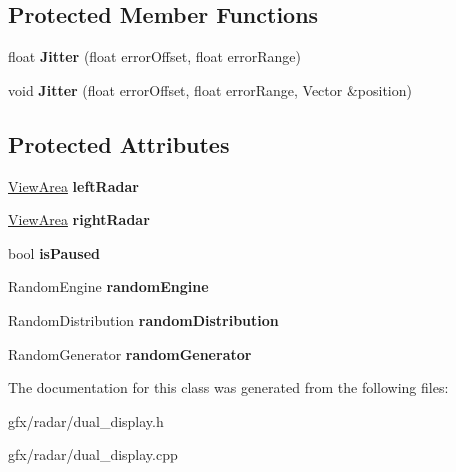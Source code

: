 \subsection*{Protected Member Functions}
\begin{DoxyCompactItemize}
\item 
float {\bfseries Jitter} (float error\+Offset, float error\+Range)\hypertarget{classRadar_1_1DualDisplayBase_a841c7f0b4a1372621bc0101fceb89f62}{}\label{classRadar_1_1DualDisplayBase_a841c7f0b4a1372621bc0101fceb89f62}

\item 
void {\bfseries Jitter} (float error\+Offset, float error\+Range, Vector \&position)\hypertarget{classRadar_1_1DualDisplayBase_ad550cc318dcfe20aba1f9ceb49d601f9}{}\label{classRadar_1_1DualDisplayBase_ad550cc318dcfe20aba1f9ceb49d601f9}

\end{DoxyCompactItemize}
\subsection*{Protected Attributes}
\begin{DoxyCompactItemize}
\item 
\hyperlink{structRadar_1_1ViewArea}{View\+Area} {\bfseries left\+Radar}\hypertarget{classRadar_1_1DualDisplayBase_ae564d416c4742feab2911a5322b2d4b5}{}\label{classRadar_1_1DualDisplayBase_ae564d416c4742feab2911a5322b2d4b5}

\item 
\hyperlink{structRadar_1_1ViewArea}{View\+Area} {\bfseries right\+Radar}\hypertarget{classRadar_1_1DualDisplayBase_ac3b3c45e0bc33c55a65aeac6f6761687}{}\label{classRadar_1_1DualDisplayBase_ac3b3c45e0bc33c55a65aeac6f6761687}

\item 
bool {\bfseries is\+Paused}\hypertarget{classRadar_1_1DualDisplayBase_ae5d31c5a3ad8a464d7b208c7ef5154f7}{}\label{classRadar_1_1DualDisplayBase_ae5d31c5a3ad8a464d7b208c7ef5154f7}

\item 
Random\+Engine {\bfseries random\+Engine}\hypertarget{classRadar_1_1DualDisplayBase_aff5a711b996d63c8614789cc9d336b52}{}\label{classRadar_1_1DualDisplayBase_aff5a711b996d63c8614789cc9d336b52}

\item 
Random\+Distribution {\bfseries random\+Distribution}\hypertarget{classRadar_1_1DualDisplayBase_af9203346ccc81c9b0640394473edef4a}{}\label{classRadar_1_1DualDisplayBase_af9203346ccc81c9b0640394473edef4a}

\item 
Random\+Generator {\bfseries random\+Generator}\hypertarget{classRadar_1_1DualDisplayBase_a9f3ab67c3ccfd06f6327f89a5076e30d}{}\label{classRadar_1_1DualDisplayBase_a9f3ab67c3ccfd06f6327f89a5076e30d}

\end{DoxyCompactItemize}


The documentation for this class was generated from the following files\+:\begin{DoxyCompactItemize}
\item 
gfx/radar/dual\+\_\+display.\+h\item 
gfx/radar/dual\+\_\+display.\+cpp\end{DoxyCompactItemize}
